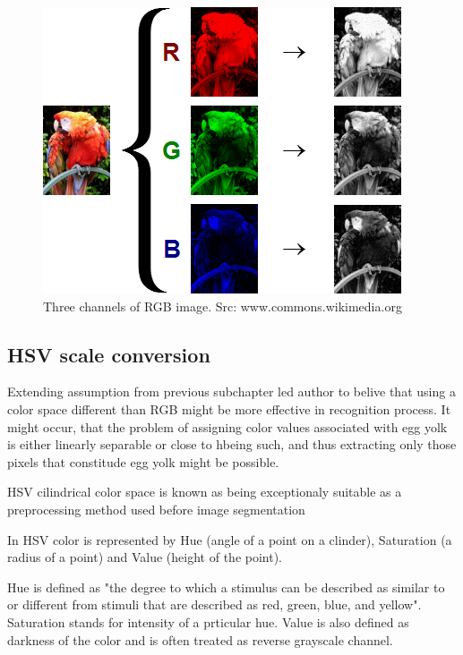 \documentclass[12pt,twoside,a4paper]{article}
\begin{document}
\begin{figure}[H]
\centering
\includegraphics[width=0.4\paperwidth]{rgb}
\caption{Three channels of RGB image. Src: www.commons.wikimedia.org}
\end{figure}


\subsection{HSV scale conversion}

Extending assumption from previous subchapter led author to belive that using a color space different than RGB might be more effective in recognition process.
It might occur, that the problem of assigning color values associated with egg yolk is either linearly separable or close to hbeing such, and thus extracting only those pixels that constitude egg yolk might be possible.

HSV cilindrical color space is known as being exceptionaly suitable as a preprocessing method used before image segmentation \cite{hsv}

In HSV color is represented by Hue (angle of a point on a clinder), Saturation (a radius of a point) and Value (height of the point).

Hue is defined as "the degree to which a stimulus can be described as similar to or different from stimuli that are described as red, green, blue, and yellow"\cite{hue}.
Saturation stands for intensity of a prticular hue.
Value is also defined as darkness of the color and is often treated as reverse grayscale channel.
\end{document}
